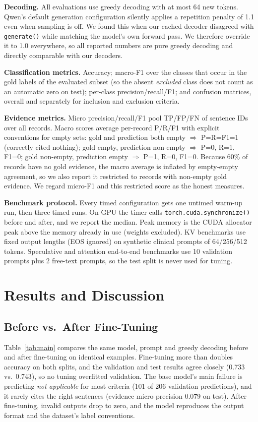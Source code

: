 \documentclass[conference]{IEEEtran}
\newcommand{\code}[1]{\texttt{\small #1}}
\begin{document}
\textbf{Decoding.} All evaluations use greedy decoding with at most 64 new tokens. Qwen's default generation configuration silently applies a repetition penalty of 1.1 even when sampling is off. We found this when our cached decoder disagreed with \code{generate()} while matching the model's own forward pass. We therefore override it to 1.0 everywhere, so all reported numbers are pure greedy decoding and directly comparable with our decoders.

\textbf{Classification metrics.} Accuracy; macro-F1 over the classes that occur in the gold labels of the evaluated subset (so the absent \emph{excluded} class does not count as an automatic zero on test); per-class precision/recall/F1; and confusion matrices, overall and separately for inclusion and exclusion criteria.

\textbf{Evidence metrics.} Micro precision/recall/F1 pool TP/FP/FN of sentence IDs over all records. Macro scores average per-record P/R/F1 with explicit conventions for empty sets: gold and prediction both empty $\Rightarrow$ P=R=F1=1 (correctly cited nothing); gold empty, prediction non-empty $\Rightarrow$ P=0, R=1, F1=0; gold non-empty, prediction empty $\Rightarrow$ P=1, R=0, F1=0. Because 60\% of records have no gold evidence, the macro average is inflated by empty-empty agreement, so we also report it restricted to records with non-empty gold evidence. We regard micro-F1 and this restricted score as the honest measures.

\textbf{Benchmark protocol.} Every timed configuration gets one untimed warm-up run, then three timed runs. On GPU the timer calls \code{torch.cuda.synchronize()} before and after, and we report the median. Peak memory is the CUDA allocator peak above the memory already in use (weights excluded). KV benchmarks use fixed output lengths (EOS ignored) on synthetic clinical prompts of 64/256/512 tokens. Speculative and attention end-to-end benchmarks use 10 validation prompts plus 2 free-text prompts, so the test split is never used for tuning.

\section{Results and Discussion}
\subsection{Before vs.\ After Fine-Tuning}
Table~\ref{tab:main} compares the same model, prompt and greedy decoding before and after fine-tuning on identical examples. Fine-tuning more than doubles accuracy on both splits, and the validation and test results agree closely (0.733 vs.\ 0.743), so no tuning overfitted validation. The base model's main failure is predicting \emph{not applicable} for most criteria (101 of 206 validation predictions), and it rarely cites the right sentences (evidence micro precision 0.079 on test). After fine-tuning, invalid outputs drop to zero, and the model reproduces the output format and the dataset's label conventions.
\end{document}
